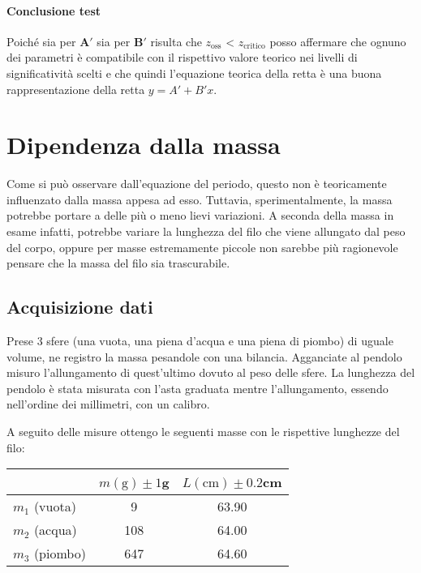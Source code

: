 \documentclass{article}
\begin{document}
	\paragraph{Conclusione test} Poiché sia per $\mathbf{A'}$ sia per $\mathbf{B'}$ risulta che $z_{\text{oss}}$ < $z_{\text{critico}}$ posso affermare che ognuno dei parametri  è compatibile con il rispettivo valore teorico nei livelli di significatività scelti e che quindi l'equazione teorica della retta è una buona rappresentazione della retta $y=A' + B'x$.\\
	
	
	
	
	
	
	
	\section{Dipendenza dalla massa}
	Come si può osservare dall'equazione del periodo, questo non è teoricamente influenzato dalla massa appesa ad esso. Tuttavia, sperimentalmente, la massa potrebbe portare a delle più o meno lievi variazioni. A seconda della massa in esame infatti, potrebbe variare la lunghezza del filo che viene allungato dal peso del corpo, oppure per masse estremamente piccole non sarebbe più ragionevole pensare che la massa del filo sia trascurabile.
	
	
	
	\subsection{Acquisizione dati}
	Prese 3 sfere (una vuota, una piena d'acqua e una piena di piombo) di uguale volume, ne registro la massa pesandole con una bilancia. Agganciate al pendolo misuro l'allungamento di quest'ultimo dovuto al peso delle sfere. La lunghezza del pendolo è stata misurata con l'asta graduata mentre l'allungamento, essendo nell'ordine dei millimetri, con un calibro. 
	
	A seguito delle misure ottengo le seguenti masse con le rispettive lunghezze del filo:
	
	\vspace{0.5cm}
	\begin{table}[H]
		\centering
		\begin{tabular}{@{}lcc@{}}
			& \multicolumn{1}{l}{$m(\text{g}) \pm 1$g} & \multicolumn{1}{l}{$L(\text{cm}) \pm 0.2$cm}  \\ \midrule
			$m_1$ (vuota)   & 9& 63.90                                            \\
			$m_2$ (acqua)  & 108 & 64.00                                          \\
			$m_3$ (piombo)  & 647  & 64.60                                        \\ \bottomrule
		\end{tabular}
	\end{table}
	\vspace{0.5cm}
	
\end{document}
